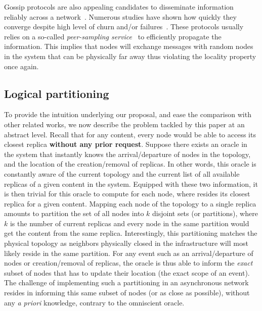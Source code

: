 Gossip protocols are also appealing candidates to disseminate information reliably across a network~\cite{epidemic-protocol}. Numerous studies have shown how quickly they converge despite high level of churn and/or failures~\cite{lpbcast}.
These protocols usually relies on a so-called \textit{peer-sampling service}~\cite{jelasity2007gossip} to efficiently propagate the information. This implies that nodes will exchange messages with random nodes in the system that can be physically far away thus violating the locality property once again. 


\subsection*{Logical partitioning}
To provide the intuition underlying our proposal, and ease the comparison with other related works, we now describe the problem tackled by this paper at an abstract level. 
Recall that for any content, every node would be able to access its closest replica \textbf{without any prior request}.
Suppose there exists an oracle in the system that instantly knows the arrival/departure of nodes in the topology, and the location of the creation/removal of replicas. In other words, this oracle is constantly aware of the current topology and the current list of all available replicas of a given content in the system. Equipped with these two information, it is then trivial for this oracle to compute for each node, where resides its closest replica for a given content. Mapping each node of the topology to a single replica amounts to partition the set of all nodes into $k$ disjoint sets (or partitions), where $k$ is the number of current replicas and every node in the same partition would get the content from the same replica. Interestingly, this partitioning matches the physical topology as neighbors physically closed in the infrastructure will most likely reside in the same partition.
For any event such as an arrival/departure of nodes or creation/removal of replicas, the oracle is thus able to inform the \textit{exact} subset of nodes that has to update their location (\ie the exact scope of an event). 
The challenge of implementing such a partitioning in an asynchronous network resides in informing this same subset of nodes (or as close as possible), without any \textit{a priori} knowledge, contrary to the omniscient oracle.


